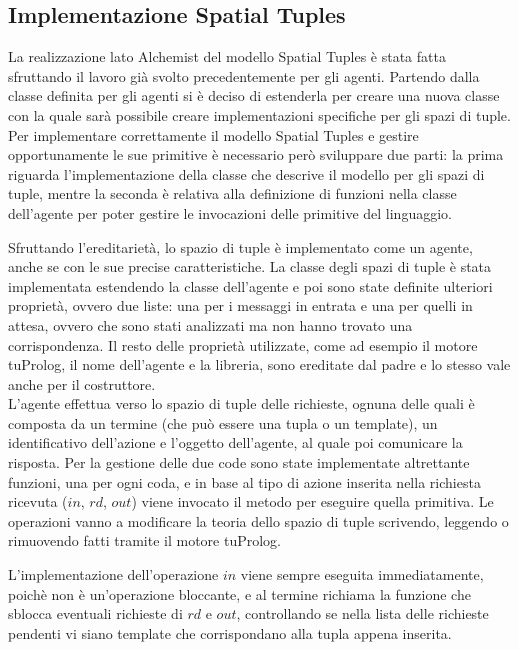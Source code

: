 \subsection{Implementazione Spatial Tuples}\label{sctn:ImplementazioneSpatialTuples}
La realizzazione lato Alchemist del modello Spatial Tuples è stata fatta sfruttando il lavoro già svolto precedentemente per gli agenti. Partendo dalla classe definita per gli agenti si è deciso di estenderla per creare una nuova classe con la quale sarà possibile creare implementazioni specifiche per gli spazi di tuple. Per implementare correttamente il modello Spatial Tuples e gestire opportunamente le sue primitive è necessario però sviluppare due parti: la prima riguarda l'implementazione della classe che descrive il modello per gli spazi di tuple, mentre la seconda è relativa alla definizione di funzioni nella classe dell'agente per poter gestire le invocazioni delle primitive del linguaggio.

Sfruttando l'ereditarietà, lo spazio di tuple è implementato come un agente, anche se con le sue precise caratteristiche. La classe degli spazi di tuple è stata implementata estendendo la classe dell'agente e poi sono state definite ulteriori proprietà, ovvero due liste: una per i messaggi in entrata e una per quelli in attesa, ovvero che sono stati analizzati ma non hanno trovato una corrispondenza.
Il resto delle proprietà utilizzate, come ad esempio il motore tuProlog, il nome dell'agente e la libreria, sono ereditate dal padre e lo stesso vale anche per il costruttore.
\\
L'agente effettua verso lo spazio di tuple delle richieste, ognuna delle quali è composta da un termine (che può essere una tupla o un template), un identificativo dell'azione e l'oggetto dell'agente, al quale poi comunicare la risposta.
Per la gestione delle due code sono state implementate altrettante funzioni, una per ogni coda, e in base al tipo di azione inserita nella richiesta ricevuta ($in$, $rd$, $out$) viene invocato il metodo per eseguire quella primitiva. Le operazioni vanno a modificare la teoria dello spazio di tuple scrivendo, leggendo o rimuovendo fatti tramite il motore tuProlog.

L'implementazione dell'operazione $in$ viene sempre eseguita immediatamente, poichè non è un'operazione bloccante, e al termine richiama la funzione che sblocca eventuali richieste di $rd$ e $out$, controllando se nella lista delle richieste pendenti vi siano template che corrispondano alla tupla appena inserita.

